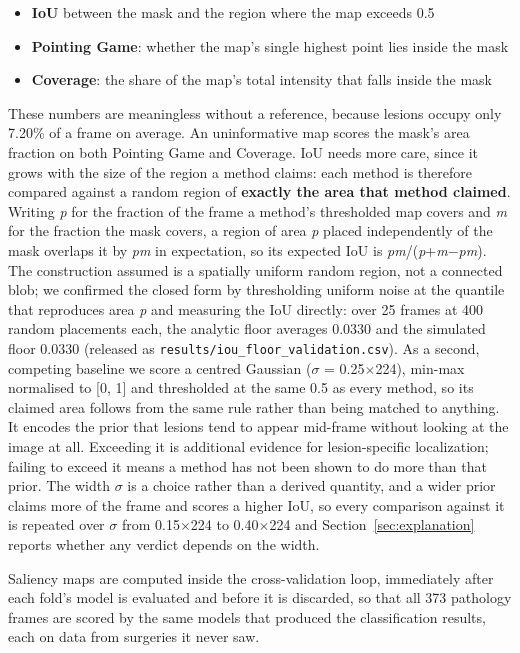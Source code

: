 \documentclass[preprint,12pt]{elsarticle}
\begin{document}
\begin{itemize}\item \textbf{IoU} between the mask and the region where the map exceeds 0.5\item \textbf{Pointing Game}: whether the map's single highest point lies inside the mask\item \textbf{Coverage}: the share of the map's total intensity that falls inside the mask\end{itemize}
These numbers are meaningless without a reference, because lesions occupy only 7.20\% of a frame on average. An uninformative map scores the mask's area fraction on both Pointing Game and Coverage. IoU needs more care, since it grows with the size of the region a method claims: each method is therefore compared against a random region of \textbf{exactly the area that method claimed}. Writing \emph{p} for the fraction of the frame a method's thresholded map covers and \emph{m} for the fraction the mask covers, a region of area \emph{p} placed independently of the mask overlaps it by \emph{pm} in expectation, so its expected IoU is \emph{pm}/(\emph{p}+\emph{m}$-$\emph{pm}). The construction assumed is a spatially uniform random region, not a connected blob; we confirmed the closed form by thresholding uniform noise at the quantile that reproduces area \emph{p} and measuring the IoU directly: over 25 frames at 400 random placements each, the analytic floor averages 0.0330 and the simulated floor 0.0330 (released as \texttt{results/iou\_floor\_validation.csv}). As a second, competing baseline we score a centred Gaussian ($\sigma$ = 0.25$\times$224), min-max normalised to [0, 1] and thresholded at the same 0.5 as every method, so its claimed area follows from the same rule rather than being matched to anything. It encodes the prior that lesions tend to appear mid-frame without looking at the image at all. Exceeding it is additional evidence for lesion-specific localization; failing to exceed it means a method has not been shown to do more than that prior. The width $\sigma$ is a choice rather than a derived quantity, and a wider prior claims more of the frame and scores a higher IoU, so every comparison against it is repeated over $\sigma$ from 0.15$\times$224 to 0.40$\times$224 and Section~\ref{sec:explanation} reports whether any verdict depends on the width.

Saliency maps are computed inside the cross-validation loop, immediately after each fold's model is evaluated and before it is discarded, so that all 373 pathology frames are scored by the same models that produced the classification results, each on data from surgeries it never saw.
\end{document}
